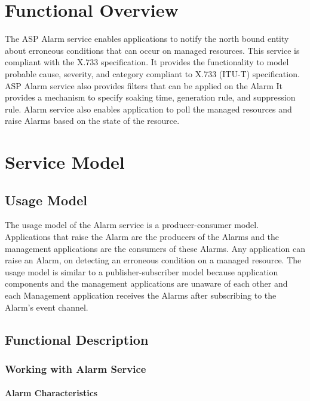 \hypertarget{group__group7}{
\chapter{Functional Overview}
\label{group__group7}
}

\begin{flushleft}


The ASP Alarm service enables applications to notify the north bound entity about erroneous conditions that can occur on managed resources. This service 
is compliant with the X.733 specification. It provides the functionality to model probable cause, severity, and category compliant to X.733 (ITU-T) specification.
ASP Alarm service also provides filters that can be applied on the Alarm  It provides a mechanism to specify soaking time, generation rule, and 
suppression rule. Alarm service also enables application to poll the managed resources and raise Alarms based on the state of the resource.

\chapter{Service Model}
\section{Usage Model}
The usage model of the Alarm service is a producer-consumer model. Applications that raise the Alarm are the producers of the Alarms and the 
management applications are the consumers of these Alarms. Any application can raise an Alarm, on detecting an erroneous condition on a managed resource. 
The usage model is similar to a publisher-subscriber model because application components and the management applications are unaware of each 
other and each Management application receives the Alarms after subscribing to the Alarm's event channel. 

\section{Functional Description}
\subsection{Working with Alarm Service}

\subsubsection{Alarm Characteristics}


\end{flushleft}
